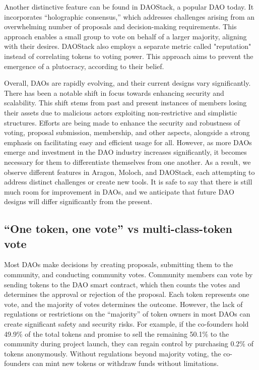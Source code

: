 \documentclass[main.tex]{subfiles}
\begin{document}
Another distinctive feature can be found in DAOStack, a popular DAO today. It incorporates ``holographic consensus,'' which addresses challenges arising from an overwhelming number of proposals and decision-making requirements. This approach enables a small group to vote on behalf of a larger majority, aligning with their desires. DAOStack also employs a separate metric called "reputation" instead of correlating tokens to voting power. This approach aims to prevent the emergence of a plutocracy, according to their belief.

Overall, DAOs are rapidly evolving, and their current designs vary significantly. There has been a notable shift in focus towards enhancing security and scalability. This shift stems from past and present instances of members losing their assets due to malicious actors exploiting non-restrictive and simplistic structures. Efforts are being made to enhance the security and robustness of voting, proposal submission, membership, and other aspects, alongside a strong emphasis on facilitating easy and efficient usage for all. However, as more DAOs emerge and investment in the DAO industry increases significantly, it becomes necessary for them to differentiate themselves from one another. As a result, we observe different features in Aragon, Moloch, and DAOStack, each attempting to address distinct challenges or create new tools. It is safe to say that there is still much room for improvement in DAOs, and we anticipate that future DAO designs will differ significantly from the present.


\subsection{``One token, one vote'' vs multi-class-token vote}

Most DAOs make decisions by creating proposals, submitting them to the community, and conducting community votes. Community members can vote by sending tokens to the DAO smart contract, which then counts the votes and determines the approval or rejection of the proposal. Each token represents one vote, and the majority of votes determines the outcome. However, the lack of regulations or restrictions on the ``majority'' of token owners in most DAOs can create significant safety and security risks. For example, if the co-founders hold 49.9\% of the total tokens and promise to sell the remaining 50.1\% to the community during project launch, they can regain control by purchasing 0.2\% of tokens anonymously. Without regulations beyond majority voting, the co-founders can mint new tokens or withdraw funds without limitations.
\end{document}
